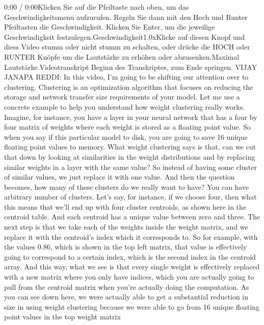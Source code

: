 {{{{{    0:00 / 0:00Klicken Sie auf die Pfeiltaste nach oben, um das Geschwindigkeitsmenu aufzurufen. Regeln Sie dann mit den Hoch und Runter Pfeiltasten die Geschwindigkeit. Klicken Sie Enter, um die jeweilige Geschwindigkeit festzulegen.Geschwindigkeit1.0xKlicke auf diesen Knopf und diess Video stumm oder nicht stumm zu schalten, oder drücke die HOCH oder RUNTER Knöpfe um die Lautstärke zu erhöhen oder abzusenken.Maximal Lautstärke.Videotranskript
    Beginn des Transkriptes, zum Ende springen.
    VIJAY JANAPA REDDI: In this video, I'm going
    to be shifting our attention over to clustering.
    Clustering is an optimization algorithm that
    focuses on reducing the storage and network transfer size requirements
    of your model.
    Let me use a concrete example to help you understand
    how weight clustering really works.
    Imagine, for instance, you have a layer in your neural network
    that has a four by four matrix of weights
    where each weight is stored as a floating point value.
    So when you say if this particular model to disk,
    you are going to save 16 unique floating point values to memory.
    What weight clustering says is that, can we
    cut that down by looking at similarities in the weight distributions
    and by replacing similar weights in a layer with the same value?
    So instead of having some cluster of similar values,
    we just replace it with one value.
    And then the question becomes, how many of these clusters
    do we really want to have?
    You can have arbitrary number of clusters.
    Let's say, for instance, if we choose four,
    then what this means that we'll end up with four cluster centroids, as shown
    here in the centroid table.
    And each centroid has a unique value between zero and three.
    The next step is that we take each of the weights inside the weight matrix,
    and we replace it with the centroid's index which it corresponds to.
    So for example, with the values 0.86, which is shown in the top left matrix,
    that value is effectively going to correspond to a certain index, which is
    the second index in the centroid array.
    And this way, what we see is that every single weight is effectively
    replaced with a new matrix where you only
    have indices, which you are actually going to pull from the centroid matrix
    when you're actually doing the computation.
    As you can see down here, we were actually
    able to get a substantial reduction in size
    in using weight clustering because we were
    able to go from 16 unique floating point values in the top weight matrix
}}}}}
